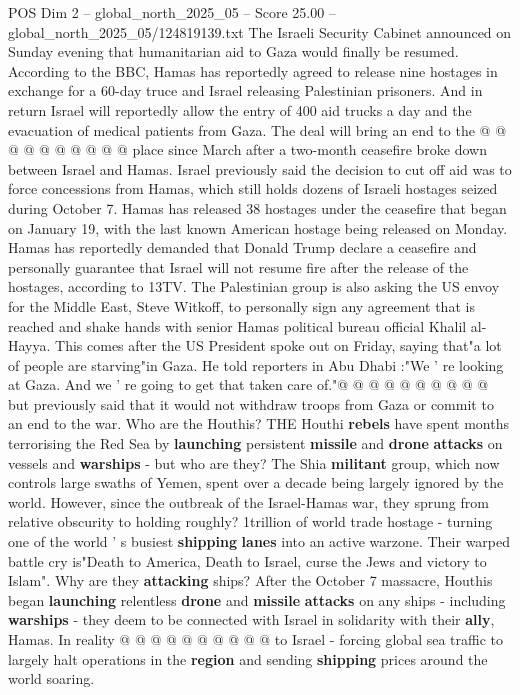 \begin{textsample}{POS Dim 2 – global\_north\_2025\_05 – Score 25.00 – global\_north\_2025\_05/124819139.txt}
The Israeli Security Cabinet announced on Sunday evening that humanitarian aid to Gaza would finally be resumed.
According to the BBC, Hamas has reportedly agreed to release nine hostages in exchange for a 60-day truce and Israel releasing Palestinian prisoners.
And in return Israel will reportedly allow the entry of 400 aid trucks a day and the evacuation of medical patients from Gaza.
The deal will bring an end to the @ @ @ @ @ @ @ @ @ @ place since March after a two-month ceasefire broke down between Israel and Hamas.
Israel previously said the decision to cut off aid was to force concessions from Hamas, which still holds dozens of Israeli hostages seized during October 7.
Hamas has released 38 hostages under the ceasefire that began on January 19, with the last known American hostage being released on Monday.
Hamas has reportedly demanded that Donald Trump declare a ceasefire and personally guarantee that Israel will not resume fire after the release of the hostages, according to 13TV.
The Palestinian group is also asking the US envoy for the Middle East, Steve Witkoff, to personally sign any agreement that is reached and shake hands with senior Hamas political bureau official Khalil al-Hayya.
This comes after the US President spoke out on Friday, saying that"a lot of people are starving"in Gaza.
He told reporters in Abu Dhabi :"We ' re looking at Gaza.
And we ' re going to get that taken care of."@ @ @ @ @ @ @ @ @ @ but previously said that it would not withdraw troops from Gaza or commit to an end to the war.
Who are the Houthis?
THE Houthi \textbf{rebels} have spent months terrorising the Red Sea by \textbf{launching} persistent \textbf{missile} and \textbf{drone} \textbf{attacks} on vessels and \textbf{warships} - but who are they?
The Shia \textbf{militant} group, which now controls large swaths of Yemen, spent over a decade being largely ignored by the world.
However, since the outbreak of the Israel-Hamas war, they sprung from relative obscurity to holding roughly? 1trillion of world trade hostage - turning one of the world ' s busiest \textbf{shipping} \textbf{lanes} into an active warzone.
Their warped battle cry is"Death to America, Death to Israel, curse the Jews and victory to Islam".
Why are they \textbf{attacking} ships?
After the October 7 massacre, Houthis began \textbf{launching} relentless \textbf{drone} and \textbf{missile} \textbf{attacks} on any ships - including \textbf{warships} - they deem to be connected with Israel in solidarity with their \textbf{ally}, Hamas.
In reality @ @ @ @ @ @ @ @ @ @ to Israel - forcing global sea traffic to largely halt operations in the \textbf{region} and sending \textbf{shipping} prices around the world soaring.

\end{textsample}
